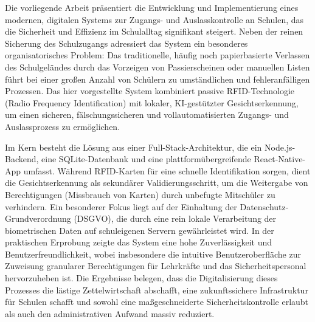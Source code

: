 
Die vorliegende Arbeit präsentiert die Entwicklung und Implementierung eines modernen, digitalen Systems zur Zugangs- und Auslasskontrolle an Schulen, das die Sicherheit und Effizienz im Schulalltag signifikant steigert. Neben der reinen Sicherung des Schulzugangs adressiert das System ein besonderes organisatorisches Problem: Das traditionelle, häufig noch papierbasierte Verlassen des Schulgeländes durch das Vorzeigen von Passierscheinen oder manuellen Listen führt bei einer großen Anzahl von Schülern zu umständlichen und fehleranfälligen Prozessen. Das hier vorgestellte System kombiniert passive RFID-Technologie (Radio Frequency Identification) mit lokaler, KI-gestützter Gesichtserkennung, um einen sicheren, fälschungssicheren und vollautomatisierten Zugangs- und Auslassprozess zu ermöglichen.

Im Kern besteht die Lösung aus einer Full-Stack-Architektur, die ein Node.js-Backend, eine SQLite-Datenbank und eine plattformübergreifende React-Native-App umfasst. Während RFID-Karten für eine schnelle Identifikation sorgen, dient die Gesichtserkennung als sekundärer Validierungsschritt, um die Weitergabe von Berechtigungen (Missbrauch von Karten) durch unbefugte Mitschüler zu verhindern. Ein besonderer Fokus liegt auf der Einhaltung der Datenschutz-Grundverordnung (DSGVO), die durch eine rein lokale Verarbeitung der biometrischen Daten auf schuleigenen Servern gewährleistet wird. In der praktischen Erprobung zeigte das System eine hohe Zuverlässigkeit und Benutzerfreundlichkeit, wobei insbesondere die intuitive Benutzeroberfläche zur Zuweisung granularer Berechtigungen für Lehrkräfte und das Sicherheitspersonal hervorzuheben ist. Die Ergebnisse belegen, dass die Digitalisierung dieses Prozesses die lästige Zettelwirtschaft abschafft, eine zukunftssichere Infrastruktur für Schulen schafft und sowohl eine maßgeschneiderte Sicherheitskontrolle erlaubt als auch den administrativen Aufwand massiv reduziert.